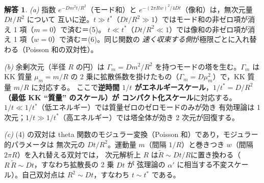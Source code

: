 \documentclass[dvipdfmx, uplatex]{jsarticle}
\theoremstyle{definition}
\newtheorem*{sol}{解答}
\begin{document}
\begin{sol}
\textit{(a)} 指数 $e^{-Dm^2t/R^2}$（モード和）と $e^{-(2\pi Rw)^2/4Dt}$（像和）は，無次元量 $Dt/R^2$ について
互いに逆。$t\gg t^\ast$（$Dt/R^2\gg1$）ではモード和の非ゼロ項が消え 1 項（$m=0$）で済む＝(5)。
$t\ll t^\ast$（$Dt/R^2\ll1$）では像和の非ゼロ項が消え 1 項（$w=0$）で済む＝(6)。同じ関数の
\emph{速く収束する側}が極限ごとに入れ替わる（Poisson 和の双対性）。

\textit{(b)} 余剰次元（半径 $R$ の円）は $\Gamma_m=Dm^2/R^2$ を持つモードの塔を生む。$\Gamma_m$ は KK 質量
$\mu_m=m/R$ の 2 乗に拡散係数を掛けたもの（$\Gamma_m=D\mu_m^2$）で，KK 質量 $m/R$ に対応する。
ここで\textbf{逆時間 $1/t$ がエネルギースケール}，\textbf{$1/t^\ast=D/R^2$（最低 KK ``質量'' のスケール）が
コンパクト化スケール}に対応する。$1/t\ll1/t^\ast$（低エネルギー）では質量ゼロのゼロモードのみが効き
有効理論は 1 次元；$1/t\gg1/t^\ast$（高エネルギー）では塔全体が効き 2 次元が回復する。

\textit{(c)} (4) の双対は theta 関数のモジュラー変換（Poisson 和）であり，モジュラー的パラメータは
無次元の $Dt/R^2$。運動量 $m$（間隔 $1/R$）と巻きつき $w$（間隔 $2\pi R$）を入れ替える双対では，
次元解析上 $R$ は\textbf{$\tilde R\sim Dt/R$}に置き換わる（$R\,\tilde R\sim Dt$，すなわち拡散長の 2 乗 $Dt$ が
弦理論の $\alpha'$ に相当する不変スケール）。自己双対点は $R^2\sim Dt$，すなわち $t\sim t^\ast$ である。
\end{sol}
\end{document}
